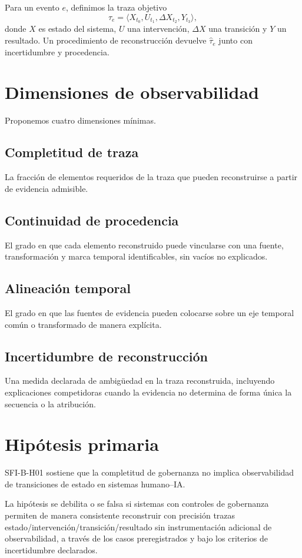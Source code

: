 \documentclass[11pt]{article}
\begin{document}
Para un evento $e$, definimos la traza objetivo
\[
\tau_e = \langle X_{t_0},U_{t_1},\Delta X_{t_2},Y_{t_3}\rangle,
\]
donde $X$ es estado del sistema, $U$ una intervención, $\Delta X$ una transición y $Y$ un resultado. Un procedimiento de reconstrucción devuelve $\hat{\tau}_e$ junto con incertidumbre y procedencia.

\section{Dimensiones de observabilidad}
Proponemos cuatro dimensiones mínimas.

\subsection{Completitud de traza}
La fracción de elementos requeridos de la traza que pueden reconstruirse a partir de evidencia admisible.

\subsection{Continuidad de procedencia}
El grado en que cada elemento reconstruido puede vincularse con una fuente, transformación y marca temporal identificables, sin vacíos no explicados.

\subsection{Alineación temporal}
El grado en que las fuentes de evidencia pueden colocarse sobre un eje temporal común o transformado de manera explícita.

\subsection{Incertidumbre de reconstrucción}
Una medida declarada de ambigüedad en la traza reconstruida, incluyendo explicaciones competidoras cuando la evidencia no determina de forma única la secuencia o la atribución.

\section{Hipótesis primaria}
SFI-B-H01 sostiene que la completitud de gobernanza no implica observabilidad de transiciones de estado en sistemas humano--IA.

La hipótesis se debilita o se falsa si sistemas con controles de gobernanza permiten de manera consistente reconstruir con precisión trazas estado/intervención/transición/resultado sin instrumentación adicional de observabilidad, a través de los casos preregistrados y bajo los criterios de incertidumbre declarados.
\end{document}
